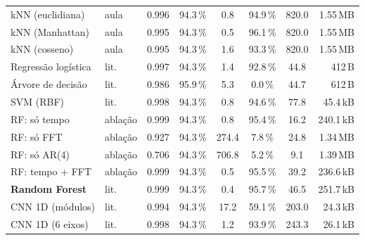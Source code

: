 \begin{table}[H]
\begin{tabular}{@{}llcccccr@{}}
kNN (euclidiana) & aula & \num{0.996} & \num{94.3}\,\% & \num{0.8} & \num{94.9}\,\% & \num{820.0} & \num{1.55}\,MB \\
kNN (Manhattan) & aula & \num{0.995} & \num{94.3}\,\% & \num{0.5} & \num{96.1}\,\% & \num{820.0} & \num{1.55}\,MB \\
kNN (cosseno) & aula & \num{0.995} & \num{94.3}\,\% & \num{1.6} & \num{93.3}\,\% & \num{820.0} & \num{1.55}\,MB \\
\midrule
Regressão logística & lit. & \num{0.997} & \num{94.3}\,\% & \num{1.4} & \num{92.8}\,\% & \num{44.8} & \num{412}\,B \\
Árvore de decisão & lit. & \num{0.986} & \num{95.9}\,\% & \num{5.3} & \num{0.0}\,\% & \num{44.7} & \num{612}\,B \\
SVM (RBF) & lit. & \num{0.998} & \num{94.3}\,\% & \num{0.8} & \num{94.6}\,\% & \num{77.8} & \num{45.4}\,kB \\
\midrule
RF: só tempo & ablação & \num{0.999} & \num{94.3}\,\% & \num{0.8} & \num{95.4}\,\% & \num{16.2} & \num{240.1}\,kB \\
RF: só FFT & ablação & \num{0.927} & \num{94.3}\,\% & \num{274.4} & \num{7.8}\,\% & \num{24.8} & \num{1.34}\,MB \\
RF: só AR(4) & ablação & \num{0.706} & \num{94.3}\,\% & \num{706.8} & \num{5.2}\,\% & \num{9.1} & \num{1.39}\,MB \\
RF: tempo + FFT & ablação & \num{0.999} & \num{94.3}\,\% & \num{0.5} & \num{95.5}\,\% & \num{39.2} & \num{236.6}\,kB \\
\midrule
\textbf{Random Forest} & lit. & \num{0.999} & \num{94.3}\,\% & \num{0.4} & \num{95.7}\,\% & \num{46.5} & \num{251.7}\,kB \\
CNN 1D (módulos) & lit. & \num{0.994} & \num{94.3}\,\% & \num{17.2} & \num{59.1}\,\% & \num{203.0} & \num{24.3}\,kB \\
CNN 1D (6 eixos) & lit. & \num{0.998} & \num{94.3}\,\% & \num{1.2} & \num{93.9}\,\% & \num{243.3} & \num{26.1}\,kB \\
\bottomrule
\end{tabular}
\end{table}
